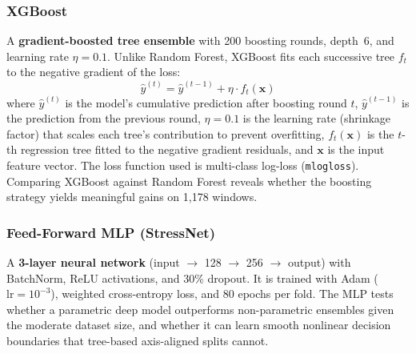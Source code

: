 \documentclass[11pt]{article}
\begin{document}
\subsubsection{XGBoost}
A \textbf{gradient-boosted tree ensemble} with 200 boosting rounds, depth~6, and learning rate $\eta = 0.1$.
Unlike Random Forest, XGBoost fits each successive tree $f_t$ to the negative gradient of the loss:
\begin{equation}
\hat{y}^{(t)} = \hat{y}^{(t-1)} + \eta \cdot f_t(\mathbf{x})
\end{equation}
where $\hat{y}^{(t)}$ is the model's cumulative prediction after boosting round $t$, $\hat{y}^{(t-1)}$ is the prediction from the previous round, $\eta = 0.1$ is the learning rate (shrinkage factor) that scales each tree's contribution to prevent overfitting, $f_t(\mathbf{x})$ is the $t$-th regression tree fitted to the negative gradient residuals, and $\mathbf{x}$ is the input feature vector.
The loss function used is multi-class log-loss (\texttt{mlogloss}).
Comparing XGBoost against Random Forest reveals whether the boosting strategy yields meaningful gains on 1{,}178 windows.

\subsubsection{Feed-Forward MLP (StressNet)}
A \textbf{3-layer neural network} (input $\rightarrow$ 128 $\rightarrow$ 256 $\rightarrow$ output) with BatchNorm, ReLU activations, and 30\% dropout.
It is trained with Adam ($\text{lr} = 10^{-3}$), weighted cross-entropy loss, and 80 epochs per fold.
The MLP tests whether a parametric deep model outperforms non-parametric ensembles given the moderate dataset size, and whether it can learn smooth nonlinear decision boundaries that tree-based axis-aligned splits cannot.
\end{document}
